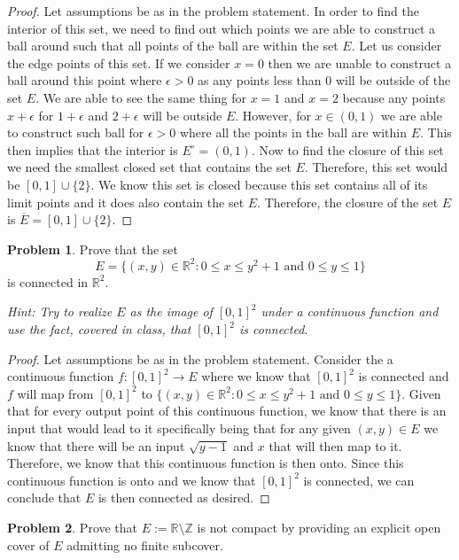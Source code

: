 \documentclass[11pt]{article}
\theoremstyle{definition}
\newtheorem{problem}{Problem}
\newcommand{\R}{\mathbb{R}}
\newcommand{\Z}{\mathbb{Z}}
\begin{document}
\begin{proof}
Let assumptions be as in the problem statement. In order to find the interior of this set, we need to find out which points we are able to construct a ball around such that all points of the ball are within the set $E.$ Let us consider the edge points of this set. If we consider $x = 0$ then we are unable to construct a ball around this point where $\epsilon > 0$ as any points less than $0$ will be outside of the set $E.$ We are able to see the same thing for $x = 1$ and $x = 2$ because any points $x + \epsilon$ for $1 + \epsilon$ and $2 + \epsilon$ will be outside $E.$ However, for $x \in (0, 1)$ we are able to construct such ball for $\epsilon > 0$ where all the points in the ball are within $E.$ This then implies that the interior is $E^\circ = (0, 1).$ Now to find the closure of this set we need the smallest closed set that contains the set $E$. Therefore, this set would be $[0, 1] \cup \{2\}$. We know this set is closed because this set contains all of its limit points and it does also contain the set $E.$ Therefore, the closure of the set $E$ is $\overline{E} = [0, 1] \cup \{2\}$.
\end{proof}

\pagebreak
\begin{problem}
Prove that the set
\[
E = \{ (x,y) \in \mathbb R^2 : 0 \leq x \leq y^2 + 1 \text{ and } 0 \leq y \leq 1\}
\]
is connected in $\R^2$. 

{\it Hint: Try to realize $E$ as the image of $[0,1]^2$ under a continuous function and use the fact, covered in class, that $[0,1]^2$ is connected.}
\end{problem}

\begin{proof}
Let assumptions be as in the problem statement. Consider the a continuous function $f: [0, 1]^2 \to E$ where we know that $[0, 1]^2$ is connected and $f$ will map from $[0, 1]^2$ to $\{(x, y)\in \R^2 : 0 \leq x \leq y^2 + 1\text{ and } 0 \leq y \leq 1\}$. Given that for every output point of this continuous function, we know that there is an input that would lead to it specifically being that for any given $(x, y) \in E$ we know that there will be an input $\sqrt{y-1}$ and $x$ that will then map to it. Therefore, we know that this continuous function is then onto. Since this continuous function is onto and we know that $[0, 1]^2$ is connected, we can conclude that $E$ is then connected as desired.
\end{proof}

\pagebreak
\begin{problem}
Prove that $E := \R \setminus \Z$ is not compact by providing an explicit open cover 
of $E$ admitting no finite subcover. 
\end{problem}
\end{document}
